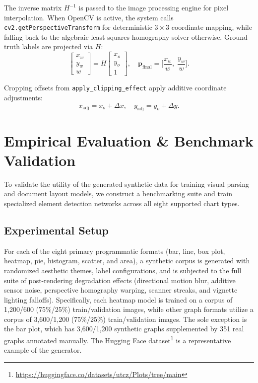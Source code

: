 \documentclass[11pt,twocolumn]{article}
\begin{document}
The inverse matrix $H^{-1}$ is passed to the image processing engine for pixel interpolation.
When OpenCV is active, the system calls \texttt{cv2.getPerspectiveTransform} for deterministic $3\times3$ coordinate mapping, while falling back to the algebraic least-squares homography solver otherwise.
Ground-truth labels are projected via $H$:
\begin{equation}\label{eq:label_warp}
  \begin{bmatrix} x_w \\ y_w \\ w\end{bmatrix} = H \begin{bmatrix} x_o \\ y_o \\ 1\end{bmatrix},\quad
  \mathbf{p}_{\text{final}} = \biggl[\frac{x_w}{w},\;\frac{y_w}{w}\biggr].
\end{equation}

Cropping offsets from \texttt{apply\_clipping\_effect} apply additive coordinate adjustments:
\begin{equation}\label{eq:clip_adjust}
  x_{\text{adj}} = x_o + \Delta x,\quad y_{\text{adj}} = y_o + \Delta y.
\end{equation}

\section{Empirical Evaluation \& Benchmark Validation}\label{sec:evaluation}

To validate the utility of the generated synthetic data for training visual parsing and document layout models, we construct a benchmarking suite and train specialized element detection networks across all eight supported chart types. 

\subsection{Experimental Setup}\label{sec:setup}

For each of the eight primary programmatic formats (bar, line, box plot, heatmap, pie, histogram, scatter, and area), a synthetic corpus is generated with randomized aesthetic themes, label configurations, and is subjected to the full suite of post-rendering degradation effects (directional motion blur, additive sensor noise, perspective homography warping, scanner streaks, and vignette lighting falloffs). Specifically, each heatmap model is trained on a corpus of 1,200/600 (75\%/25\%) train/validation images, while other graph formats utilize a corpus of 3,600/1,200 (75\%/25\%) train/validation images. The sole exception is the bar plot, which has 3,600/1,200 synthetic graphs supplemented by 351 real graphs annotated manually. The Hugging Face dataset\footnote{\url{https://huggingface.co/datasets/utcz/Plots/tree/main}} is a representative example of the generator.
\end{document}
